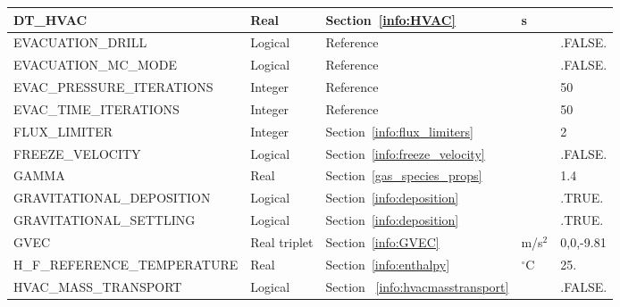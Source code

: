 \documentclass[11pt]{book}
\begin{document}
\begin{longtable}{@{\extracolsep{\fill}}|l|l|l|l|l|}
{\ct DT\_HVAC}                                  & Real          & Section~\ref{info:HVAC}                               & s             &                   \\ \hline
{\ct EVACUATION\_DRILL}                         & Logical       & Reference~\cite{FDS_Evac_Users_Guide}                 &               & {\ct .FALSE.}     \\ \hline
{\ct EVACUATION\_MC\_MODE}                      & Logical       & Reference~\cite{FDS_Evac_Users_Guide}                 &               & {\ct .FALSE.}     \\ \hline
{\ct EVAC\_PRESSURE\_ITERATIONS}                & Integer       & Reference~\cite{FDS_Evac_Users_Guide}                 &               & 50                \\ \hline
{\ct EVAC\_TIME\_ITERATIONS}                    & Integer       & Reference~\cite{FDS_Evac_Users_Guide}                 &               & 50                \\ \hline
{\ct FLUX\_LIMITER}                             & Integer       & Section~\ref{info:flux_limiters}                      &               & 2                 \\ \hline
{\ct FREEZE\_VELOCITY}                          & Logical       & Section~\ref{info:freeze_velocity}                    &               & {\ct .FALSE.}     \\ \hline
{\ct GAMMA}                                     & Real          & Section~\ref{gas_species_props}                       &               & 1.4               \\ \hline
{\ct GRAVITATIONAL\_DEPOSITION}                 & Logical       & Section~\ref{info:deposition}                         &               & {\ct .TRUE.}      \\ \hline
{\ct GRAVITATIONAL\_SETTLING}                   & Logical       & Section~\ref{info:deposition}                         &               & {\ct .TRUE.}      \\ \hline
{\ct GVEC}                                      & Real triplet  & Section~\ref{info:GVEC}                               & m/s$^2$       & 0,0,-9.81         \\ \hline
{\ct H\_F\_REFERENCE\_TEMPERATURE}              & Real          & Section~\ref{info:enthalpy}                           & $^\circ$C     & 25.             \\ \hline
{\ct HVAC\_MASS\_TRANSPORT}                     & Logical       & Section ~\ref{info:hvacmasstransport}                 &               & {\ct .FALSE.}     \\ \hline

\end{longtable}
\end{document}
